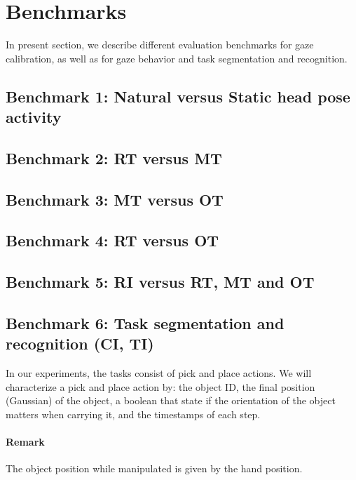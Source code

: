 \documentclass[11pt,a4paper]{article}
\begin{document}
\section{Benchmarks}
\label{Benchmarks}
In present section, we describe different evaluation benchmarks for gaze calibration, as well as for gaze behavior and task segmentation and recognition.
\subsection{Benchmark 1: Natural versus Static head pose activity}
\subsection{Benchmark 2: RT versus MT} 
\subsection{Benchmark 3: MT versus OT}
\subsection{Benchmark 4: RT versus OT}
\subsection{Benchmark 5: RI versus RT, MT and OT}
\subsection{Benchmark 6: Task segmentation and recognition (CI, TI)}
In our experiments, the tasks consist of pick and place actions. We will characterize a pick and place action by: the object ID, the final position (Gaussian) of the object, a boolean that state if the orientation of the object matters when carrying it, and the timestamps of each step.
\paragraph{Remark} The object position while manipulated is given by the hand position.
\end{document}
